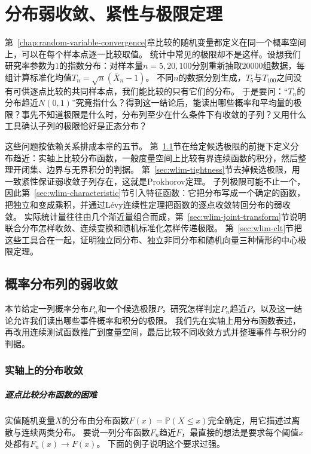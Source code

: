 \chapter{分布弱收敛、紧性与极限定理}
\label{chap:weak-convergence-limit-theorems}

第~\ref{chap:random-variable-convergence}章比较的随机变量都定义在同一个概率空间上，可以在每个样本点逐一比较取值。
统计中常见的极限却不是这样。设想我们研究率参数为$1$的指数分布：对样本量$n=5,20,100$分别重新抽取$20000$组数据，每组计算标准化均值$T_n=\sqrt n(\bar X_n-1)$。
不同$n$的数据分别生成，$T_5$与$T_{100}$之间没有可供逐点比较的共同样本点，我们能比较的只有它们的分布。
于是要问：“$T_n$的分布趋近$N(0,1)$”究竟指什么？得到这一结论后，能读出哪些概率和平均量的极限？事先不知道极限是什么时，分布列至少在什么条件下有收敛的子列？又用什么工具确认子列的极限恰好是正态分布？

这些问题按依赖关系排成本章的五节。
第~\ref{sec:wlim-weak-convergence}节在给定候选极限的前提下定义分布趋近：实轴上比较分布函数，一般度量空间上比较有界连续函数的积分，然后整理开闭集、边界与无界积分的判据。
第~\ref{sec:wlim-tightness}节去掉候选极限，用一致紧性保证弱收敛子列存在，这就是Prokhorov定理。
子列极限可能不止一个，因此第~\ref{sec:wlim-characteristic}节引入特征函数：它把分布写成一个确定的函数，把独立和变成乘积，并通过L\'evy连续性定理把函数的逐点收敛转回分布的弱收敛。
实际统计量往往由几个渐近量组合而成，第~\ref{sec:wlim-joint-transform}节说明联合分布怎样收敛、连续变换和随机标准化怎样传递极限。
第~\ref{sec:wlim-clt}节把这些工具合在一起，证明独立同分布、独立非同分布和随机向量三种情形的中心极限定理。

\section{概率分布列的弱收敛}
\label{sec:wlim-weak-convergence}

本节给定一列概率分布$P_n$和一个候选极限$P$，研究怎样判定$P_n$趋近$P$，以及这一结论允许我们读出哪些事件概率和积分的极限。
我们先在实轴上用分布函数表述，再改用连续测试函数推广到度量空间，最后比较不同收敛方式并整理事件与积分的判据。

\subsection{实轴上的分布收敛}

\paragraph{逐点比较分布函数的困难}
实值随机变量$X$的分布由分布函数$F(x)=\mathbb P(X\leq x)$完全确定，用它描述过离散与连续两类分布。
要说一列分布函数$F_n$趋近$F$，最直接的想法是要求每个阈值$x$处都有$F_n(x)\to F(x)$。
下面的例子说明这个要求过强。

